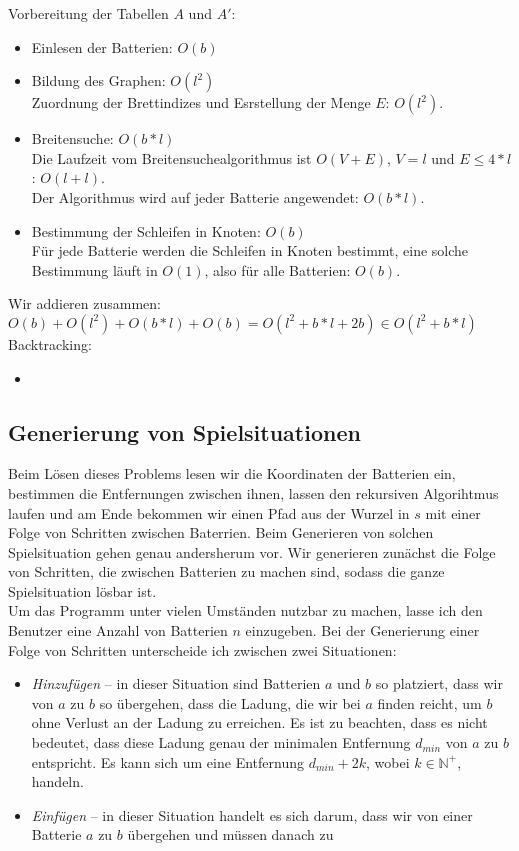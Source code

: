 \documentclass[a4paper,10pt,ngerman]{scrartcl}
\begin{document}
Vorbereitung der Tabellen $A$ und $A'$:
\begin{itemize}
  \item Einlesen der Batterien: $O(b)$
  \item Bildung des Graphen: $O(l^2)$\\
  Zuordnung der Brettindizes und Esrstellung der Menge $E$: $O(l^2)$.
  \item Breitensuche: $O(b*l)$\\
  Die Laufzeit vom Breitensuchealgorithmus ist $O(V + E)$,\cite{cormen:BFS}  $V = l$ und $E \leqslant 4*l$: $O(l+l)$.\\
  Der Algorithmus wird auf jeder Batterie angewendet: $O(b*l)$.
  \item Bestimmung der Schleifen in Knoten: $O(b)$\\
  Für jede Batterie werden die Schleifen in Knoten bestimmt, eine solche Bestimmung läuft in $O(1)$,
  also für alle Batterien: $O(b)$.
\end{itemize}

Wir addieren zusammen:\\
$O(b) + O(l^2) + O(b*l) + O(b) = O(l^2 + b*l + 2b) \in O(l^2 + b*l)$\\

Backtracking:
\begin{itemize}
  \item 
\end{itemize}

\newpage
\subsection{Generierung von Spielsituationen}
Beim Lösen dieses Problems lesen wir die Koordinaten der Batterien ein, bestimmen die Entfernungen zwischen ihnen,
lassen den rekursiven Algorihtmus laufen und am Ende bekommen wir einen Pfad aus der Wurzel in $s$ mit einer Folge von
Schritten zwischen Baterrien. Beim Generieren von solchen Spielsituation gehen genau andersherum vor.
Wir generieren zunächst die Folge von Schritten, die zwischen Batterien zu machen sind, sodass die ganze 
Spielsituation lösbar ist.\\
Um das Programm unter vielen Umständen nutzbar zu machen, lasse ich den Benutzer eine Anzahl von Batterien $n$ einzugeben.
Bei der Generierung einer Folge von Schritten unterscheide ich zwischen zwei Situationen:
\begin{itemize}
  \item \textit{Hinzufügen} -- in dieser Situation sind Batterien $a$ und $b$ so platziert, 
    dass wir von $a$ zu $b$ so übergehen, dass die Ladung, die wir bei $a$ finden reicht, um $b$ ohne Verlust an der Ladung
    zu erreichen. Es ist zu beachten, dass es nicht bedeutet, dass diese Ladung genau der minimalen Entfernung $d_{min}$ von $a$ zu $b$ entspricht.
    Es kann sich um eine Entfernung $d_{min}+2k$, wobei $k \in \mathbb{N^{+}}$, handeln.
  \item \textit{Einfügen} -- in dieser Situation handelt es sich darum, dass wir von einer Batterie $a$ zu $b$ übergehen und müssen danach
   zu
\end{itemize}
\end{document}
